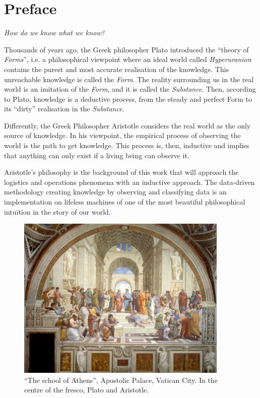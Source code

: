 \chapter*{Preface}


\epigraph{\textit{How do we know what we know?}}{}

Thousands of years ago, the Greek philosopher Plato introduced the “theory of \textit{Forms}”, i.e. a philosophical viewpoint where an ideal world called \textit{Hyperuranion} contains the purest and most accurate realisation of the knowledge. This unreachable knowledge is called the \textit{Form}. The reality surrounding us in the real world is an imitation of the \textit{Form}, and it is called the \textit{Substance}. Then, according to Plato, knowledge is a deductive process, from the steady and perfect Form to its “dirty” realisation in the \textit{Substance}.\par

Differently, the Greek Philosopher Aristotle considers the real world as the only source of knowledge. In his viewpoint, the empirical process of observing the world is the path to get knowledge. This process is, then, inductive and implies that anything can only exist if a living being can observe it.\par

Aristotle’s philosophy is the background of this work that will approach the logistics and operations phenomena with an inductive approach. The data-driven methodology creating knowledge by observing and classifying data is an implementation on lifeless machines of one of the most beautiful philosophical intuition in the story of our world.\par


\begin{figure}[hbt!]
\centering
\includegraphics[width=0.9\textwidth]{other/preface_figures/laScuolaDiAtene.jpg}
\captionsetup{type=figure}
\caption{“The school of Athens”, Apostolic Palace, Vatican City. In the centre of the fresco, Plato and Aristotle.}
\end{figure}
